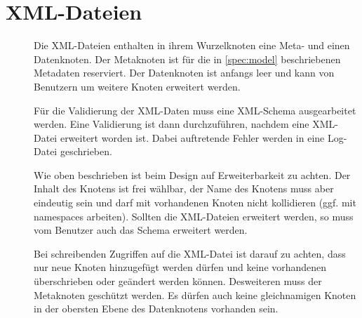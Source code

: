 \section{XML-Dateien} \label{spec:xml}
\begin{description}
	\item []
		Die XML-Dateien enthalten in ihrem Wurzelknoten eine Meta- und einen Datenknoten.
		Der Metaknoten ist für die in \ref{spec:model} beschriebenen Metadaten reserviert.
		Der Datenknoten ist anfangs leer und kann von Benutzern um weitere Knoten erweitert werden.
	\item []
		Für die Validierung der XML-Daten muss eine XML-Schema ausgearbeitet werden.
		Eine Validierung ist dann durchzuführen, nachdem eine XML-Datei erweitert worden ist.
		Dabei auftretende Fehler werden in eine Log-Datei geschrieben.
	\item []
		Wie oben beschrieben ist beim Design auf Erweiterbarkeit zu achten.
		Der Inhalt des Knotens ist frei wählbar, der Name des Knotens muss aber
		eindeutig sein und darf mit vorhandenen Knoten nicht kollidieren
		(ggf. mit namespaces arbeiten).
		Sollten die XML-Dateien erweitert werden, so muss vom Benutzer auch das Schema erweitert werden.
	\item []
		Bei schreibenden Zugriffen auf die XML-Datei ist darauf zu achten, 
		dass nur neue Knoten hinzugefügt werden dürfen und
		keine vorhandenen überschrieben oder geändert werden können.
		Desweiteren muss der Metaknoten geschützt werden.
		Es dürfen auch keine gleichnamigen Knoten in der obersten Ebene des Datenknotens
		vorhanden sein.
\end{description}
	
